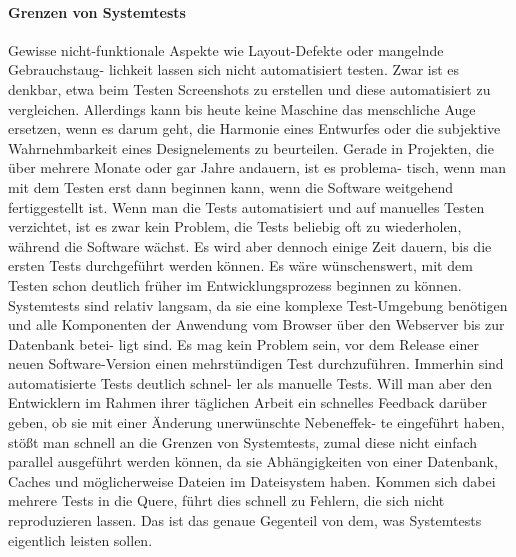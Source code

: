 \paragraph{Grenzen von Systemtests}
Gewisse nicht-funktionale Aspekte wie Layout-Defekte oder mangelnde Gebrauchstaug-
lichkeit lassen sich nicht automatisiert testen. Zwar ist es denkbar, etwa beim Testen
Screenshots zu erstellen und diese automatisiert zu vergleichen. Allerdings kann bis heute
keine Maschine das menschliche Auge ersetzen, wenn es darum geht, die Harmonie eines
Entwurfes oder die subjektive Wahrnehmbarkeit eines Designelements zu beurteilen.
Gerade in Projekten, die über mehrere Monate oder gar Jahre andauern, ist es problema-
tisch, wenn man mit dem Testen erst dann beginnen kann, wenn die Software weitgehend
fertiggestellt ist. Wenn man die Tests automatisiert und auf manuelles Testen verzichtet, ist
es zwar kein Problem, die Tests beliebig oft zu wiederholen, während die Software wächst.
Es wird aber dennoch einige Zeit dauern, bis die ersten Tests durchgeführt werden können.
Es wäre wünschenswert, mit dem Testen schon deutlich früher im Entwicklungsprozess
beginnen zu können.
Systemtests sind relativ langsam, da sie eine komplexe Test-Umgebung benötigen und alle
Komponenten der Anwendung vom Browser über den Webserver bis zur Datenbank betei-
ligt sind. Es mag kein Problem sein, vor dem Release einer neuen Software-Version einen
mehrstündigen Test durchzuführen. Immerhin sind automatisierte Tests deutlich schnel-
ler als manuelle Tests. Will man aber den Entwicklern im Rahmen ihrer täglichen Arbeit ein
schnelles Feedback darüber geben, ob sie mit einer Änderung unerwünschte Nebeneffek-
te eingeführt haben, stößt man schnell an die Grenzen von Systemtests, zumal diese nicht
einfach parallel ausgeführt werden können, da sie Abhängigkeiten von einer Datenbank,
Caches und möglicherweise Dateien im Dateisystem haben. Kommen sich dabei mehrere
Tests in die Quere, führt dies schnell zu Fehlern, die sich nicht reproduzieren lassen. Das
ist das genaue Gegenteil von dem, was Systemtests eigentlich leisten sollen.

